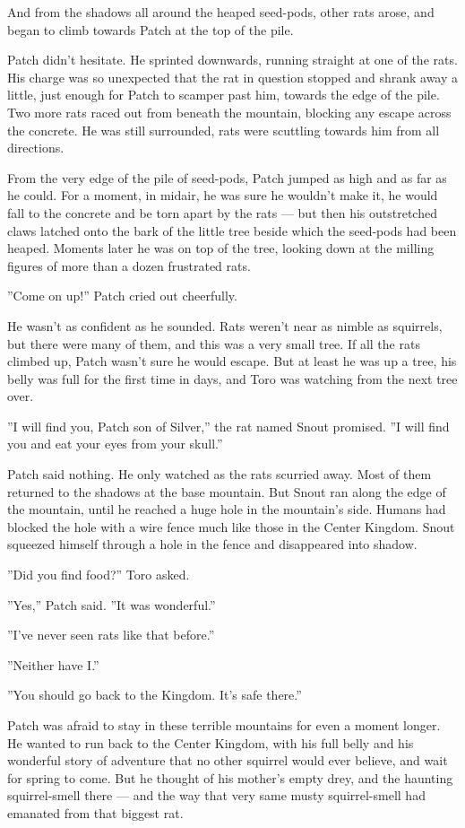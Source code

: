 \documentclass[12pt]{book}
\begin{document}
And from the shadows all around the heaped seed-pods, other rats
arose, and began to climb towards Patch at the top of the pile.

Patch didn't hesitate. He sprinted downwards, running straight at one
of the rats. His charge was so unexpected that the rat in question
stopped and shrank away a little, just enough for Patch to scamper
past him, towards the edge of the pile. Two more rats raced out from
beneath the mountain, blocking any escape across the concrete. He was
still surrounded, rats were scuttling towards him from all directions.

From the very edge of the pile of seed-pods, Patch jumped as high and
as far as he could. For a moment, in midair, he was sure he wouldn't
make it, he would fall to the concrete and be torn apart by the rats
--- but then his outstretched claws latched onto the bark of the
little tree beside which the seed-pods had been heaped. Moments later
he was on top of the tree, looking down at the milling figures of more
than a dozen frustrated rats.

''Come on up!'' Patch cried out cheerfully.

He wasn't as confident as he sounded. Rats weren't near as nimble as
squirrels, but there were many of them, and this was a very small
tree. If all the rats climbed up, Patch wasn't sure he would
escape. But at least he was up a tree, his belly was full for the
first time in days, and Toro was watching from the next tree over.

''I will find you, Patch son of Silver,'' the rat named Snout
promised. ''I will find you and eat your eyes from your skull.''

Patch said nothing. He only watched as the rats scurried away. Most of
them returned to the shadows at the base mountain. But Snout ran along
the edge of the mountain, until he reached a huge hole in the
mountain's side. Humans had blocked the hole with a wire fence much
like those in the Center Kingdom. Snout squeezed himself through a
hole in the fence and disappeared into shadow.

''Did you find food?'' Toro asked.

''Yes,'' Patch said. ''It was wonderful.''

''I've never seen rats like that before.''

''Neither have I.''

''You should go back to the Kingdom. It's safe there.''

Patch was afraid to stay in these terrible mountains for even a moment
longer. He wanted to run back to the Center Kingdom, with his full
belly and his wonderful story of adventure that no other squirrel
would ever believe, and wait for spring to come. But he thought of his
mother's empty drey, and the haunting squirrel-smell there --- and the
way that very same musty squirrel-smell had emanated from that biggest
rat.
\end{document}
